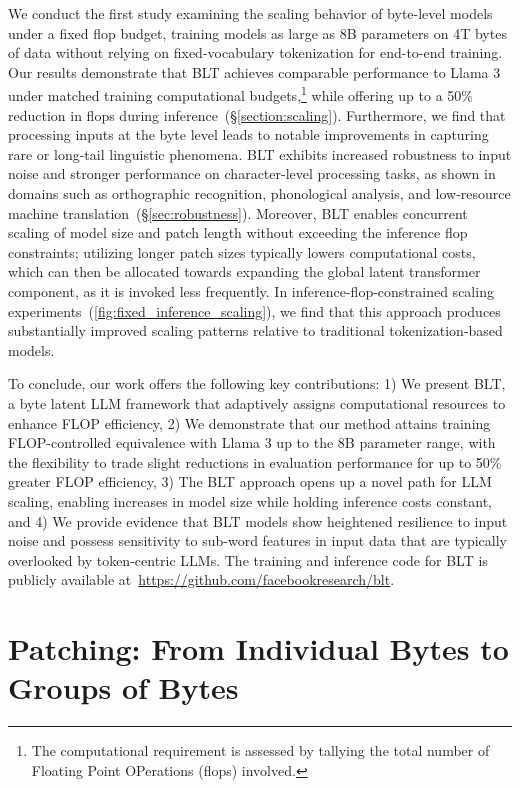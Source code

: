 We conduct the first study examining the scaling behavior of byte-level models under a fixed flop budget, training models as large as 8B parameters on 4T bytes of data without relying on fixed-vocabulary tokenization for end-to-end training. Our results demonstrate that {\textsc BLT} achieves comparable performance to Llama 3 under matched training computational budgets,\footnote{The computational requirement is assessed by tallying the total number of Floating Point OPerations (flops) involved.} while offering up to a 50\% reduction in flops during inference~(\S\ref{section:scaling}). Furthermore, we find that processing inputs at the byte level leads to notable improvements in capturing rare or long-tail linguistic phenomena. {\textsc BLT} exhibits increased robustness to input noise and stronger performance on character-level processing tasks, as shown in domains such as orthographic recognition, phonological analysis, and low-resource machine translation~(\S\ref{sec:robustness}). Moreover, {\textsc BLT} enables concurrent scaling of model size and patch length without exceeding the inference flop constraints; utilizing longer patch sizes typically lowers computational costs, which can then be allocated towards expanding the global latent transformer component, as it is invoked less frequently. In inference-flop-constrained scaling experiments~(\autoref{fig:fixed_inference_scaling}), we find that this approach produces substantially improved scaling patterns relative to traditional tokenization-based models.

To conclude, our work offers the following key contributions: 1) We present {\textsc BLT}, a byte latent LLM framework that adaptively assigns computational resources to enhance FLOP efficiency, 2) We demonstrate that our method attains training FLOP-controlled equivalence with Llama 3 up to the 8B parameter range, with the flexibility to trade slight reductions in evaluation performance for up to 50\% greater FLOP efficiency, 3) The {\textsc BLT} approach opens up a novel path for LLM scaling, enabling increases in model size while holding inference costs constant, and 4) We provide evidence that {\textsc BLT} models show heightened resilience to input noise and possess sensitivity to sub-word features in input data that are typically overlooked by token-centric LLMs. The training and inference code for {\textsc BLT} is publicly available at~\url{https://github.com/facebookresearch/blt}.

\section{Patching: From Individual Bytes to Groups of Bytes}
\label{section:patching}

